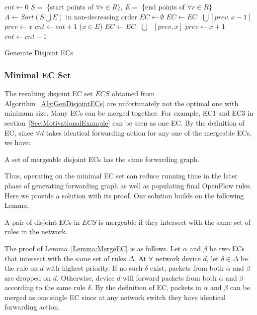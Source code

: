 \begin{algorithm}[h]
\DontPrintSemicolon
{}
$cnt \gets 0$\;
$S = $ \{start points of $\forall r \in R\}$, $E = $ \{end points of $\forall r \in R\}$\;
$A \gets Sort(S \bigcup E)$ in non-decreasing order\;
$EC \gets \emptyset$\;
 {
         {
                 {\label{Alg:LineEndStart1} 
                        $EC \gets EC \text{ }\bigcup \text{} [prev, x-1]$\;
                }\label{Alg:LineEndStart2} 
                $prev \gets x$\;\label{Alg:LineNewPrev1}
                $cnt \gets cnt + 1$\;
        }
        \Else ($x \in E$) {
                $EC \gets EC \text{ } \bigcup \text{ } [prev, x]$\;\label{Alg:LineEndEnd}
                $prev \gets x + 1$\;\label{Alg:LineNewPrev2}
                $cnt \gets cnt - 1$\;
        }
}
\caption{Generate Disjoint ECs\label{Alg:GenDisjointECs}}
\end{algorithm}

\subsubsection{Minimal EC Set}
The resulting disjoint EC set $ECS$ obtained from Algorithm~\ref{Alg:GenDisjointECs} are unfortunately not the optimal one with minimum size.
Many ECs can be merged together.
For example, EC1 and EC3 in section~\ref{Sec:MotivationalExample} can be seen as one EC.
By the definition of EC, since $\forall d$ takes identical forwarding action for any one of
the mergeable ECs, we have:
\begin{lemma}
A set of mergeable disjoint ECs has the same forwarding graph.
\label{Lemma:MergeFG}
\end{lemma}
Thus, operating on the minimal EC set can reduce running time in the later phase of
generating forwarding graph as well as populating final OpenFlow rules.
Here we provide a solution with its proof.
Our solution builds on the following Lemma.
\begin{lemma}
A pair of disjoint ECs in $ECS$ is mergeable if they intersect with
the same set of rules in the network.
\label{Lemma:MergeEC}
\end{lemma}
The proof of Lemma~\ref{Lemma:MergeEC} is as follows.
Let $\alpha$ and $\beta$ be two ECs that intersect with the same set of rules $\Delta$.
At $\forall$ network device $d$, let $\delta \in \Delta$ be the rule on $d$ with
highest priority.
If no such $\delta$ exist, packets from both $\alpha$ and $\beta$ are dropped on $d$.
Otherwise, device $d$ will forward packets from both $\alpha$ and $\beta$ according to the same
rule $\delta$.
By the definition of EC, packets in $\alpha$ and $\beta$ can be merged as one single EC
since at any network switch they have identical forwarding action.

